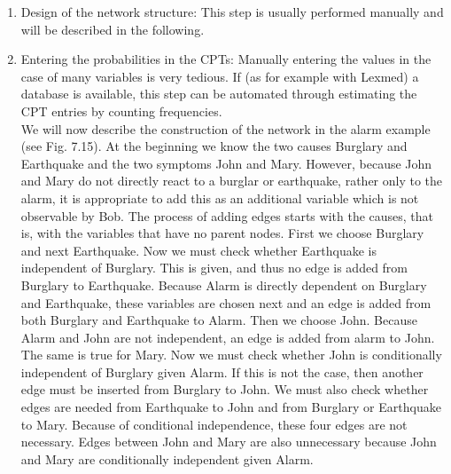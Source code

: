 \documentclass[10pt]{book}
\begin{document}
\begin{center}
\begin{enumerate}
\begin{enumerate}
  \item Design of the network structure: This step is usually performed manually and will be described in the following.
  \item Entering the probabilities in the CPTs: Manually entering the values in the case of many variables is very tedious. If (as for example with Lexmed) a database is available, this step can be automated through estimating the CPT entries by counting frequencies.\\
We will now describe the construction of the network in the alarm example (see Fig. 7.15). At the beginning we know the two causes Burglary and Earthquake and the two symptoms John and Mary. However, because John and Mary do not directly react to a burglar or earthquake, rather only to the alarm, it is appropriate to add this as an additional variable which is not observable by Bob. The process of adding edges starts with the causes, that is, with the variables that have no parent nodes. First we choose Burglary and next Earthquake. Now we must check whether Earthquake is independent of Burglary. This is given, and thus no edge is added from Burglary to Earthquake. Because Alarm is directly dependent on Burglary and Earthquake, these variables are chosen next and an edge is added from both Burglary and Earthquake to Alarm. Then we choose John. Because Alarm and John are not independent, an edge is added from alarm to John. The same is true for Mary. Now we must check whether John is conditionally independent of Burglary given Alarm. If this is not the case, then another edge must be inserted from Burglary to John. We must also check whether edges are needed from Earthquake to John and from Burglary or Earthquake to Mary. Because of conditional independence, these four edges are not necessary. Edges between John and Mary are also unnecessary because John and Mary are conditionally independent given Alarm.
\end{enumerate}


\end{enumerate}
\end{center}
\end{document}
